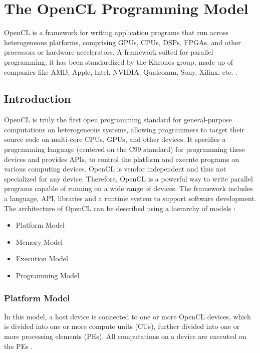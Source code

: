 \chapter{The OpenCL Programming Model}
\label{ch4_opencl}

OpenCL is a framework for writing application programs that run across heterogeneous platforms, comprising \ac{GPU}s, \ac{CPU}s, \ac{DSP}s, \ac{FPGA}s, and other processors or hardware accelerators\cite{opencl_wiki}. A framework suited for parallel programming, it has been standardized by the Khronos group, made up of companies like AMD, Apple, Intel, NVIDIA, Qualcomm, Sony, Xilinx, etc. \cite{opencl_fixstars}.

\section{Introduction}

OpenCL is truly the first open programming standard for general-purpose computations on heterogeneous systems, allowing programmers to target their source code on multi-core CPUs, GPUs, and other devices. It specifies a programming language (centered on the C99 standard) for programming these devices and provides \ac{API}s, to control the platform and execute programs on various computing devices. OpenCL is vendor independent and thus not specialized for any device. Therefore, OpenCL is a powerful way to write parallel programs capable of running on a wide range of devices. \newline\newline
The framework includes a language, API, libraries and a runtime system to support software development. The architecture of OpenCL can be described using a hierarchy of models \cite{opencl_ajg}:

\begin{itemize}
\item Platform Model
\item Memory Model
\item Execution Model
\item Programming Model
\end{itemize}

\subsection{Platform Model}
In this model, a host device is connected to one or more OpenCL devices, which is divided into one or more compute units (CUs), further divided into one or more processing elements (PEs). All computations on a device are executed on the PEs \cite{opencl_khronos}.

